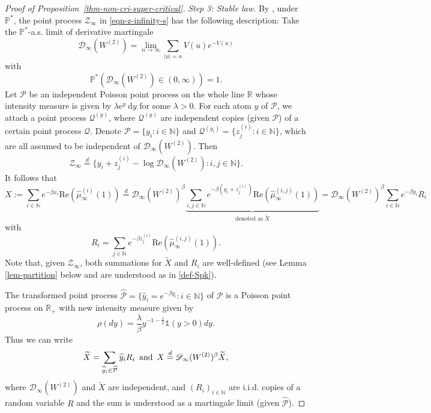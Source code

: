 \documentclass[12pt]{amsart}
\theoremstyle{definition}
\theoremstyle{remark}
\newcommand{\R}{\mathbb{R}}
\newcommand{\N}{\mathbb{N}}
\newcommand{\PP}{\mathbb{P}}
\newcommand{\an}{\text{\, and \,}}
\numberwithin{equation}{section}
\begin{document}
\begin{proof}[Proof of Proposition~\ref{thm-non-cri-super-critical}]
{\flushleft \it Step 3: Stable law.}    
By \cite[Theorem~1.1]{Mad}, under $\PP^*$, the point process $\mathcal{Z}_\infty$ in \eqref{eqn-z-infinity-s} has the following description:  Take the $\PP^*$-a.s. limit of derivative martingale 
\[
\mathscr{D}_\infty(W^{(2)})=\lim_{n\to\infty}\sum_{|u|=n} V(u) e^{-V(u)}
\] 
with 
\[
 \PP^*(\mathscr{D}_\infty(W^{(2)})\in(0,\infty))=1.
\]
Let $\mathcal{P}$ be an independent Poisson point process on the whole line $\R$ whose intensity measure is given by  $\lambda\mathrm{e}^y \mathrm{~d} y$ for some $\lambda>0$. For each atom $y$ of $\mathcal{P}$, we attach a point process $\mathcal{Q}^{(y)}$, where $\mathcal{Q}^{(y)}$ are independent copies  (given $\mathcal{P}$) of a certain point process $\mathcal{Q}$.  Denote $\mathcal{P}=\{y_i: i\in\N\}$ and $\mathcal{Q}^{(y_i)}=\{z_j^{(i)}: i\in \N\}$, which are all assumed to be independent of $\mathscr{D}_\infty(W^{(2)})$.   Then 
\[
\mathcal{Z}_\infty \stackrel{d}{=}\{y_i+z_j^{(i)} - \log \mathscr{D}_\infty(W^{(2)}): i, j\in\N\}.
\]
It follows that 
\[
X:=       \sum_{i\in \N} e^{-\beta x_i}   \mathrm{Re}( \widehat{\mu}^{(i)}_\infty(1) )  \stackrel{d}{=}  \mathscr{D}_\infty(W^{(2)})^\beta  \underbrace{ \sum_{i, j\in\N}e^{-\beta (y_i+z_j^{(i)})}\mathrm{Re}(\widehat{\mu}^{(i, j)}_\infty(1))}_{\text{denoted as $\widetilde{X}$}}=\mathscr{D}_\infty(W^{(2)})^\beta \sum_{i\in \N}e^{-\beta y_i} R_i
\]
 with 
 \[
 R_i=\sum_{j\in\N} e^{-\beta z_j^{(i)}}\mathrm{Re}(\widehat{\mu}^{(i, j)}_\infty(1)). 
\]
Note that, given $\mathcal{Z}_\infty$,  both summations for $\widetilde{X}$ and   $R_i$ are  well-defined (see Lemma \ref{lem-partition}  below and are understood as in \eqref{def-Spk}). 

The transformed  point process  $\widehat{\mathcal{P}}=\{\widehat{y}_i=e^{-\beta y_i}: i\in \N\}$ of $\mathcal{P}$  is  a Poisson point process on $\R_+$ with new intensity measure given by 
\[
\rho(dy)=\frac{\lambda}{\beta}y^{-1-\frac{1}{\beta}}  \mathds{1}(y>0) dy.
\]
Thus we can write 
  \[
  \widetilde{X}= \sum_{\widehat{y}_i\in \widehat{\mathcal{P}}}\widehat{y}_i R_i  \an X \overset{d}{=} \mathscr{D}_\infty(W^{(2)})^\beta\widetilde{X},
  \]
   where $\mathscr{D}_\infty(W^{(2)})$ and $\widetilde{X}$ are independent, and $(R_i)_{i\in\N}$ are i.i.d. copies of a random variable $R$ and the sum is understood as a   martingale limit (given $\widehat{\mathcal{P}}$). 


\end{proof}
\end{document}

